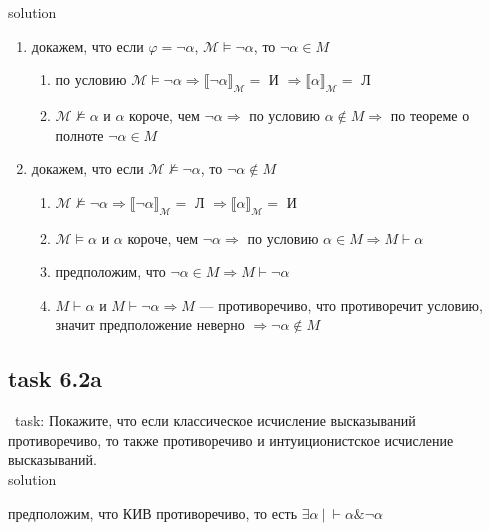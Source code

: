 \documentclass[12pt]{article}
\begin{document}
solution

\begin{enumerate}
    \item докажем, что если $\varphi = \neg\alpha$, $\mathcal{M}\models\neg\alpha$, то $\neg\alpha\in M$

    \begin{enumerate}
        \item по условию $\mathcal{M}\models\neg\alpha \Rightarrow \llbracket \neg\alpha \rrbracket_\mathcal{M}=$ И $\Rightarrow \llbracket \alpha \rrbracket_\mathcal{M}=$ Л
        \item $\mathcal{M}\not\models\alpha$ и $\alpha$ короче, чем $\neg\alpha\Rightarrow$ по условию $\alpha\not\in M \Rightarrow$ по теореме о полноте $\neg\alpha\in M$
    \end{enumerate}

    \item докажем, что если $\mathcal{M}\not\models\neg\alpha$, то $\neg\alpha\notin M$

    \begin{enumerate}
        \item $\mathcal{M}\not\models\neg\alpha \Rightarrow\llbracket \neg\alpha \rrbracket_\mathcal{M}=$ Л $\Rightarrow \llbracket \alpha \rrbracket_\mathcal{M}=$ И
        \item $\mathcal{M}\models\alpha$ и $\alpha$ короче, чем $\neg\alpha\Rightarrow$ по условию $\alpha\in M \Rightarrow M\vdash \alpha$
        \item предположим, что $\neg\alpha\in M  \Rightarrow M\vdash \neg\alpha$
        \item $M\vdash \alpha$ и $M\vdash \neg\alpha\Rightarrow M$ --- противоречиво, что противоречит условию, значит предположение неверно $\Rightarrow \neg\alpha\not\in M$
    \end{enumerate}

\end{enumerate}

\subsection*{task 6.2a}

\quad\ task: Покажите, что если классическое исчисление высказываний противоречиво, то также противоречиво и интуиционистское исчисление высказываний.\\

solution

предположим, что КИВ противоречиво, то есть $\exists\alpha\ |\ \vdash\alpha\&\neg\alpha$
\end{document}
